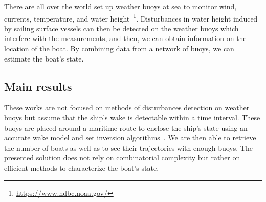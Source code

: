 \documentclass[14pt, a4paper]{article}
\begin{document}
		There are all over the world set up weather buoys at sea to monitor wind, currents, temperature, and water height~\footnote{\url{https://www.ndbc.noaa.gov/}}. Disturbances in water height induced by sailing surface vessels can then be detected on the weather buoys which interfere with the measurements, and then, we can obtain information on the location of the boat. By combining data from a network of buoys, we can estimate the boat's state.

	\subsection*{Main results}
		These works are not focused on methods of disturbances detection on weather buoys but assume that the ship's wake is detectable within a time interval. These buoys are placed around a maritime route to enclose the ship's state using an accurate wake model and set inversion algorithms~\cite{JaulinWalter93SetInvAutom}. We are then able to retrieve the number of boats as well as to see their trajectories with enough buoys. The presented solution does not rely on combinatorial complexity but rather on efficient methods to characterize the boat's state.
		
	\printbibliography[title={References},heading=subbibliography]

	\medskip
\end{document}
